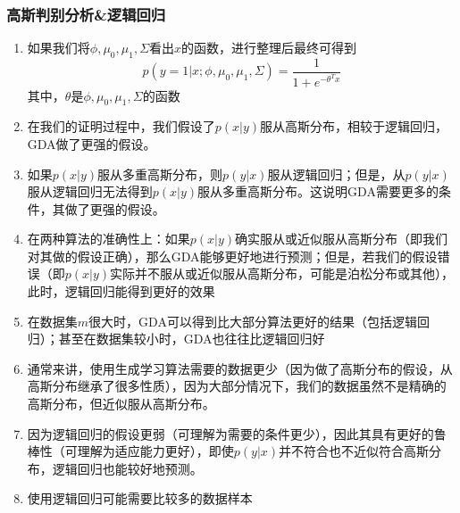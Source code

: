 \subsubsection{高斯判别分析\&逻辑回归}
\begin{enumerate}
	\item 如果我们将$\phi, \mu_0, \mu_1, \Sigma$看出$x$的函数，进行整理后最终可得到
	\begin{equation}
		p(y=1|x; \phi, \mu_0, \mu_1, \Sigma) = \frac{1}{1+e^{-\theta^Tx}}
	\end{equation}
	其中，$\theta$是$\phi, \mu_0, \mu_1, \Sigma$的函数
	\item 在我们的证明过程中，我们假设了$p(x|y)$服从高斯分布，相较于逻辑回归，GDA做了更强的假设。
	\item 如果$p(x|y)$服从多重高斯分布，则$p(y|x)$服从逻辑回归；但是，从$p(y|x)$服从逻辑回归无法得到$p(x|y)$服从多重高斯分布。这说明GDA需要更多的条件，其做了更强的假设。
	\item 在两种算法的准确性上：如果$p(x|y)$确实服从或近似服从高斯分布（即我们对其做的假设正确），那么GDA能够更好地进行预测；但是，若我们的假设错误（即$p(x|y)$实际并不服从或近似服从高斯分布，可能是泊松分布或其他），此时，逻辑回归能得到更好的效果
	\item 在数据集$m$很大时，GDA可以得到比大部分算法更好的结果（包括逻辑回归）；甚至在数据集较小时，GDA也往往比逻辑回归好
	\item 通常来讲，使用生成学习算法需要的数据更少（因为做了高斯分布的假设，从高斯分布继承了很多性质），因为大部分情况下，我们的数据虽然不是精确的高斯分布，但近似服从高斯分布。
	\item 因为逻辑回归的假设更弱（可理解为需要的条件更少），因此其具有更好的鲁棒性（可理解为适应能力更好），即使$p(y|x)$并不符合也不近似符合高斯分布，逻辑回归也能较好地预测。
	\item 使用逻辑回归可能需要比较多的数据样本
\end{enumerate}















